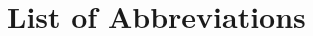\documentclass{CSUNthesis}
\begin{document}

\begin{spacing}{1.5}
  \tableofcontents
\end{spacing}

\begin{spacing}{1.5}
  \listoffigures
\end{spacing}

\begin{spacing}{1.5}
  \listoftables
\end{spacing}


\cleardoublepage
{}
{}
\chapter*{List of Abbreviations}
\end{document}
